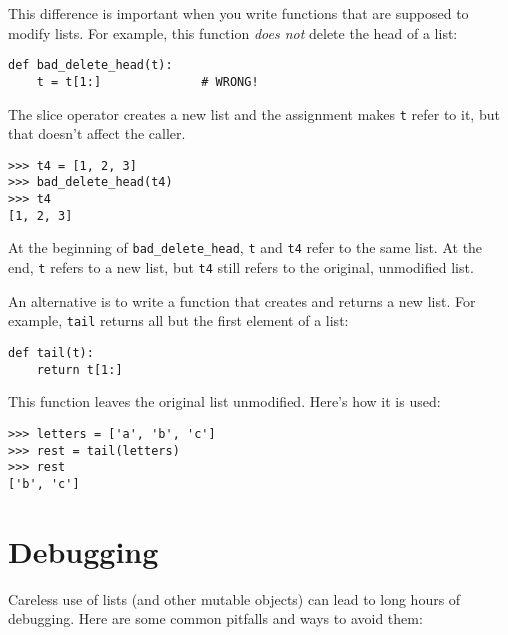 \documentclass[10pt]{book}
\begin{document}
This difference is important when you write functions that
are supposed to modify lists.  For example, this function
{\em does not} delete the head of a list:
%
\begin{verbatim}
def bad_delete_head(t):
    t = t[1:]              # WRONG!
\end{verbatim}
%
The slice operator creates a new list and the assignment
makes {\tt t} refer to it, but that doesn't affect the caller.
%
\begin{verbatim}
>>> t4 = [1, 2, 3]
>>> bad_delete_head(t4)
>>> t4
[1, 2, 3]
\end{verbatim}
%
At the beginning of \verb"bad_delete_head", {\tt t} and {\tt t4}
refer to the same list.  At the end, {\tt t} refers to a new list,
but {\tt t4} still refers to the original, unmodified list.

An alternative is to write a function that creates and
returns a new list.  For
example, {\tt tail} returns all but the first
element of a list:

\begin{verbatim}
def tail(t):
    return t[1:]
\end{verbatim}
%
This function leaves the original list unmodified.
Here's how it is used:

\begin{verbatim}
>>> letters = ['a', 'b', 'c']
>>> rest = tail(letters)
>>> rest
['b', 'c']
\end{verbatim}



\section{Debugging}

Careless use of lists (and other mutable objects)
can lead to long hours of debugging.  Here are some common
pitfalls and ways to avoid them:
\end{document}
